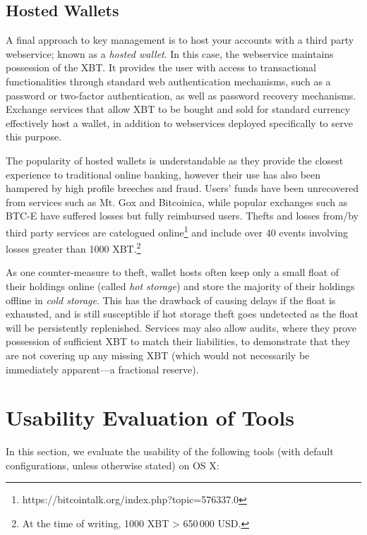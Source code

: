 \subsection{Hosted Wallets} 

A final approach to key management is to host your accounts with a third party webservice; known as a \textit{hosted wallet}. In this case, the webservice maintains possession of the XBT. It provides the user with access to transactional functionalities through standard web authentication mechanisms, such as a password or two-factor authentication, as well as password recovery mechanisms. Exchange services that allow XBT to be bought and sold for standard currency effectively host a wallet, in addition to webservices deployed specifically to serve this purpose. 

The popularity of hosted wallets is understandable as they provide the closest experience to traditional online banking, however their use has also been hampered by high profile breeches and fraud. Users' funds have been unrecovered from services such as Mt. Gox and Bitcoinica, while popular exchanges such as BTC-E have suffered losses but fully reimbursed users. Thefts and losses from/by third party services are catelogued online\footnote{https://bitcointalk.org/index.php?topic=576337.0} and include over 40 events involving losses greater than 1000 XBT.\footnote{At the time of writing, 1000 XBT > 650\,000 USD.}

As one counter-measure to theft, wallet hosts often keep only a small float of their holdings online (called \textit{hot storage}) and store the majority of their holdings offline in \textit{cold storage}. This has the drawback of causing delays if the float is exhausted, and is still susceptible if hot storage theft goes undetected as the float will be persistently replenished. Services may also allow audits, where they prove possession of sufficient XBT to match their liabilities, to demonstrate that they are not covering up any missing XBT (which would not necessarily be immediately apparent---\cf a fractional reserve).  


\section{Usability Evaluation of Tools}

In this section, we evaluate the usability of the following tools (with default configurations, unless otherwise stated) on OS X:

